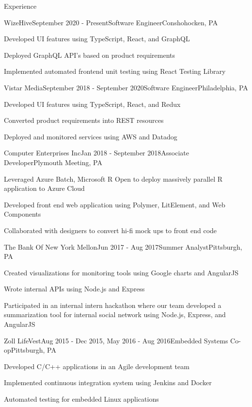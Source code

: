 \documentclass{resume} %
\begin{document}
\begin{rSection}{Experience}


\begin{rSubsection}{WizeHive}{September 2020 - Present}{Software Engineer}{Conshohocken, PA}
\item Developed UI features using TypeScript, React, and GraphQL
\item Deployed GraphQL API's based on product requirements
\item Implemented automated frontend unit testing using React Testing Library
\end{rSubsection}

\begin{rSubsection}{Vistar Media}{September 2018 - September 2020}{Software Engineer}{Philadelphia, PA}
\item Developed UI features using TypeScript, React, and Redux
\item Converted product requirements into REST resources
\item Deployed and monitored services using AWS and Datadog
\end{rSubsection}

\begin{rSubsection}{Computer Enterprises Inc}{Jan 2018 - September 2018}{Associate Developer}{Plymouth Meeting, PA}
\item Leveraged Azure Batch, Microsoft R Open to deploy massively parallel R application to Azure Cloud
\item Developed front end web application using Polymer, LitElement, and Web Components
\item Collaborated with designers to convert hi-fi mock ups to front end code
\end{rSubsection}

\begin{rSubsection}{The Bank Of New York Mellon}{Jun 2017 - Aug 2017}{Summer Analyst}{Pittsburgh, PA}
\item Created visualizations for monitoring tools using Google charts and AngularJS
\item Wrote internal APIs using Node.js and Express 
\item Participated in an internal intern hackathon where our team developed a summarization tool for internal social network using Node.js, Express, and AngularJS
\end{rSubsection}


\begin{rSubsection}{Zoll LifeVest}{Aug 2015 - Dec 2015, May 2016 - Aug 2016}{Embedded Systems Co-op}{Pittsburgh, PA}
\item Developed C/C++ applications in an Agile development team
\item Implemented continuous integration system using Jenkins and Docker
\item Automated testing for embedded Linux applications
\end{rSubsection}



\end{rSection}
\end{document}
